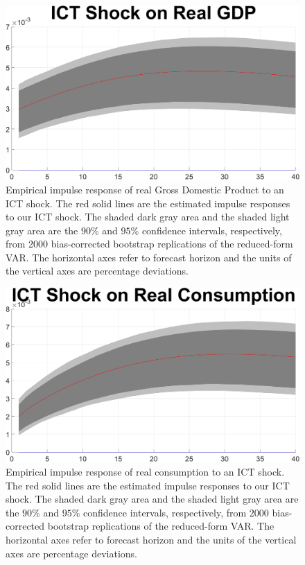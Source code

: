 \documentclass[12pt]{article}
\begin{document}
\newpage


	\begin{figure}[h!]
	\begin{center}
		\includegraphics[scale=0.35]{MainFigures/fig_ICT_Shock_on_Real_GDP_empirical_noH}
		\caption{Empirical impulse response of real Gross Domestic Product to an ICT shock. The red solid lines are the estimated impulse responses to our ICT shock. The shaded dark gray area and the shaded light gray area are the $90$\% and $95$\% confidence intervals, respectively, from 2000 bias-corrected bootstrap replications of the reduced-form VAR. The horizontal axes refer to forecast horizon and the units of the vertical axes are percentage deviations.}
		\label{fig:GDP_main}
	\end{center} 
\end{figure}

\newpage


	\begin{figure}[h!]
	\begin{center}
		\includegraphics[scale=0.35]{MainFigures/fig_ICT_Shock_on_Real_Consumption_empirical_noH}
		\caption{Empirical impulse response of real consumption to an ICT shock. The red solid lines are the estimated impulse responses to our ICT shock. The shaded dark gray area and the shaded light gray area are the $90$\% and $95$\% confidence intervals, respectively, from 2000 bias-corrected bootstrap replications of the reduced-form VAR. The horizontal axes refer to forecast horizon and the units of the vertical axes are percentage deviations.}
		\label{fig:C_main}
	\end{center} 
\end{figure}
\end{document}
